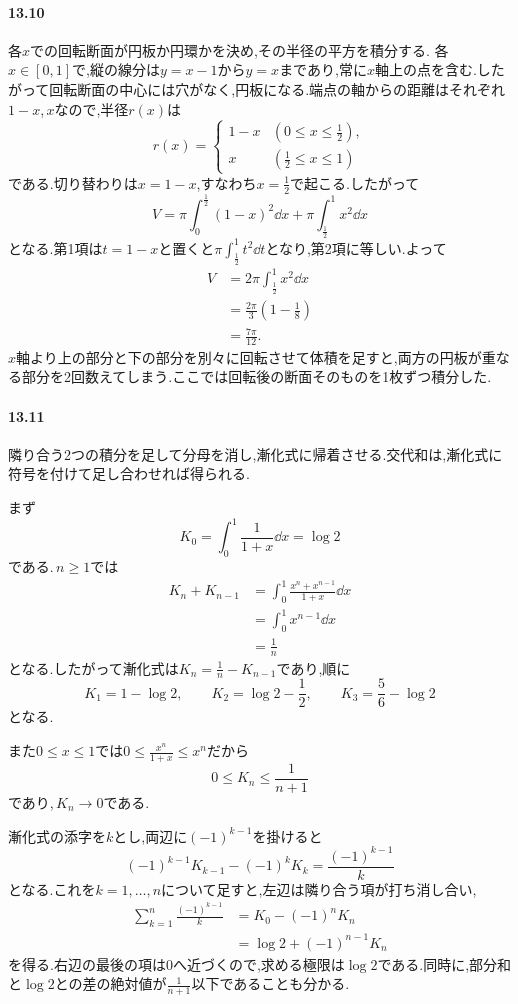 \paragraph{13.10}
各$x$での回転断面が円板か円環かを決め,その半径の平方を積分する.
各$x\in[0,1]$で,縦の線分は$y=x-1$から$y=x$まであり,常に$x$軸上の点を含む.したがって回転断面の中心には穴がなく,円板になる.端点の軸からの距離はそれぞれ$1-x$,\,$x$なので,半径$r(x)$は
\[
 r(x)=
 \begin{cases}
  1-x&\left(0\le x\le\frac12\right),\\
  x&\left(\frac12\le x\le1\right)
 \end{cases}
\]
である.切り替わりは$x=1-x$,すなわち$x=\frac12$で起こる.したがって
\[
 V=\pi\int_0^{\frac12}(1-x)^2\dd x
   +\pi\int_{\frac12}^{1}x^2\dd x
\]
となる.第1項は$t=1-x$と置くと$\pi\int_{\frac12}^1t^2\dd t$となり,第2項に等しい.よって
\[
 \begin{aligned}
 V&=2\pi\int_{\frac12}^{1}x^2\dd x\\
 &=\frac{2\pi}{3}\left(1-\frac18\right)\\
 &=\boxed{\frac{7\pi}{12}}.
 \end{aligned}
\]
$x$軸より上の部分と下の部分を別々に回転させて体積を足すと,両方の円板が重なる部分を2回数えてしまう.ここでは回転後の断面そのものを1枚ずつ積分した.

\paragraph{13.11}
隣り合う2つの積分を足して分母を消し,漸化式に帰着させる.交代和は,漸化式に符号を付けて足し合わせれば得られる.

まず
\[
 K_0=\int_0^1\frac1{1+x}\dd x=\log2
\]
である.\,$n\ge1$では
\[
 \begin{aligned}
 K_n+K_{n-1}
 &=\int_0^1\frac{x^n+x^{n-1}}{1+x}\dd x\\
 &=\int_0^1x^{n-1}\dd x\\
 &=\frac1n
 \end{aligned}
\]
となる.したがって漸化式は$K_n=\frac1n-K_{n-1}$であり,順に
\[
 K_1=1-\log2,\qquad
 K_2=\log2-\frac12,\qquad
 \boxed{K_3=\frac56-\log2}
\]
となる.

また$0\le x\le1$では$0\le\frac{x^n}{1+x}\le x^n$だから
\[
 0\le K_n\le\frac1{n+1}
\]
であり,\,$K_n\to0$である.

漸化式の添字を$k$とし,両辺に$(-1)^{k-1}$を掛けると
\[
 (-1)^{k-1}K_{k-1}-(-1)^kK_k=\frac{(-1)^{k-1}}k
\]
となる.これを$k=1,\ldots,n$について足すと,左辺は隣り合う項が打ち消し合い,
\[
 \begin{aligned}
 \sum_{k=1}^n\frac{(-1)^{k-1}}k
 &=K_0-(-1)^nK_n\\
 &=\log2+(-1)^{n-1}K_n
 \end{aligned}
\]
を得る.右辺の最後の項は$0$へ近づくので,求める極限は$\log2$である.同時に,部分和と$\log2$との差の絶対値が$\frac1{n+1}$以下であることも分かる.

